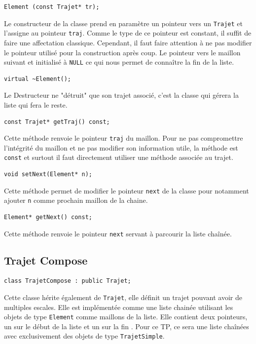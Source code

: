 \documentclass[11pt, a4paper]{article}
\begin{document}
\begin{lstlisting}
Element (const Trajet* tr);
\end{lstlisting}
Le constructeur de la classe prend en paramètre un pointeur vers un \texttt{Trajet} et l'assigne au pointeur
\texttt{traj}. Comme le type de ce pointeur est constant, il suffit de faire une affectation
classique. Cependant, il faut faire attention à ne pas modifier le pointeur utilisé pour la
construction après coup. Le pointeur vers le maillon suivant et initialisé à \texttt{NULL} ce qui
nous permet de connaître la fin de la liste.

\begin{lstlisting}
virtual ~Element();
\end{lstlisting}
Le Destructeur ne "détruit" que son trajet associé, c'est la classe qui gérera la liste qui fera le
reste.

\begin{lstlisting}
const Trajet* getTraj() const;
\end{lstlisting}
Cette méthode renvoie le pointeur \texttt{traj} du maillon. Pour ne pas compromettre l'intégrité du
maillon et ne pas modifier son information utile, la méthode est \texttt{const} et surtout il faut
directement utiliser une méthode associée au trajet.

\begin{lstlisting}
void setNext(Element* n);
\end{lstlisting}
Cette méthode permet de modifier le pointeur \texttt{next} de la classe pour notamment ajouter
\texttt{n} comme prochain maillon de la chaine.

\begin{lstlisting}
Element* getNext() const;
\end{lstlisting}
Cette méthode renvoie le pointeur \texttt{next} servant à parcourir la liste chaînée.\\

\subsection{Trajet Compose}
\begin{lstlisting}
class TrajetCompose : public Trajet;
\end{lstlisting}
Cette classe hérite également de \texttt{Trajet}, elle définit un trajet pouvant avoir de multiples
escales. Elle est implémentée comme une liste chainée utilisant les objets de type \texttt{Element}
comme maillons de la liste. Elle contient deux pointeurs, un sur le début de la liste et un sur la
fin . Pour ce TP, ce sera une liste chaînées avec exclusivement des objets de type
\texttt{TrajetSimple}.
\end{document}
